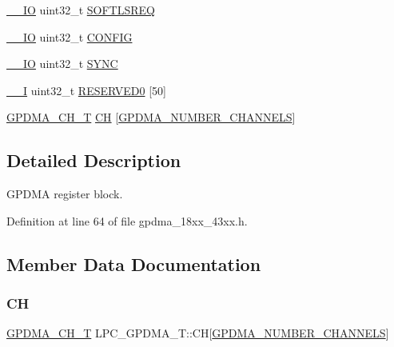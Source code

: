 \begin{DoxyCompactItemize}
\item 
\hyperlink{core__sc300_8h_aec43007d9998a0a0e01faede4133d6be}{\+\_\+\+\_\+\+IO} uint32\+\_\+t \hyperlink{struct_l_p_c___g_p_d_m_a___t_a0b7a85e9f40e19d368c8358ca48778de}{S\+O\+F\+T\+L\+S\+R\+EQ}
\item 
\hyperlink{core__sc300_8h_aec43007d9998a0a0e01faede4133d6be}{\+\_\+\+\_\+\+IO} uint32\+\_\+t \hyperlink{struct_l_p_c___g_p_d_m_a___t_a059b4997225adef9a773dca681a4b676}{C\+O\+N\+F\+IG}
\item 
\hyperlink{core__sc300_8h_aec43007d9998a0a0e01faede4133d6be}{\+\_\+\+\_\+\+IO} uint32\+\_\+t \hyperlink{struct_l_p_c___g_p_d_m_a___t_ac89c20888b14781ead9fe459f8f79853}{S\+Y\+NC}
\item 
\hyperlink{core__sc300_8h_af63697ed9952cc71e1225efe205f6cd3}{\+\_\+\+\_\+I} uint32\+\_\+t \hyperlink{struct_l_p_c___g_p_d_m_a___t_aa500686787db277559756be8d486c0c2}{R\+E\+S\+E\+R\+V\+E\+D0} \mbox{[}50\mbox{]}
\item 
\hyperlink{struct_g_p_d_m_a___c_h___t}{G\+P\+D\+M\+A\+\_\+\+C\+H\+\_\+T} \hyperlink{struct_l_p_c___g_p_d_m_a___t_ab6b2ec077df490e64b10e7cb2bfeee10}{CH} \mbox{[}\hyperlink{group___g_p_d_m_a__18_x_x__43_x_x_gaf7c43b3d13c91c30ddf67e479966d5cd}{G\+P\+D\+M\+A\+\_\+\+N\+U\+M\+B\+E\+R\+\_\+\+C\+H\+A\+N\+N\+E\+LS}\mbox{]}
\end{DoxyCompactItemize}


\subsection{Detailed Description}
G\+P\+D\+MA register block. 

Definition at line 64 of file gpdma\+\_\+18xx\+\_\+43xx.\+h.



\subsection{Member Data Documentation}
\mbox{\label{struct_l_p_c___g_p_d_m_a___t_ab6b2ec077df490e64b10e7cb2bfeee10}} 
\subsubsection{\texorpdfstring{CH}{CH}}
{\footnotesize\ttfamily \hyperlink{struct_g_p_d_m_a___c_h___t}{G\+P\+D\+M\+A\+\_\+\+C\+H\+\_\+T} L\+P\+C\+\_\+\+G\+P\+D\+M\+A\+\_\+\+T\+::\+CH\mbox{[}\hyperlink{group___g_p_d_m_a__18_x_x__43_x_x_gaf7c43b3d13c91c30ddf67e479966d5cd}{G\+P\+D\+M\+A\+\_\+\+N\+U\+M\+B\+E\+R\+\_\+\+C\+H\+A\+N\+N\+E\+LS}\mbox{]}}



